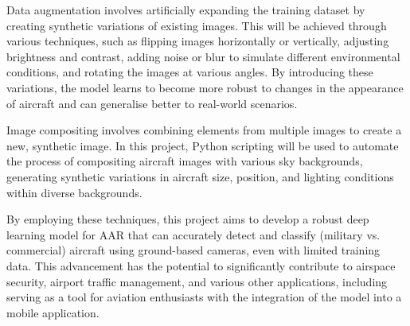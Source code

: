 Data augmentation involves artificially expanding the training dataset by creating synthetic variations of existing images. This will be achieved through various techniques, such as flipping images horizontally or vertically, adjusting brightness and contrast, adding noise or blur to simulate different environmental conditions, and rotating the images at various angles. By introducing these variations, the model learns to become more robust to changes in the appearance of aircraft and can generalise better to real-world scenarios.

Image compositing involves combining elements from multiple images to create a new, synthetic image. In this project, Python scripting will be used to automate the process of compositing aircraft images with various sky backgrounds, generating synthetic variations in aircraft size, position, and lighting conditions within diverse backgrounds. 

By employing these techniques, this project aims to develop a robust deep learning model for AAR that can accurately detect and classify (military vs. commercial) aircraft using ground-based cameras, even with limited training data. This advancement has the potential to significantly contribute to airspace security, airport traffic management, and various other applications, including serving as a tool for aviation enthusiasts with the integration of the model into a mobile application.